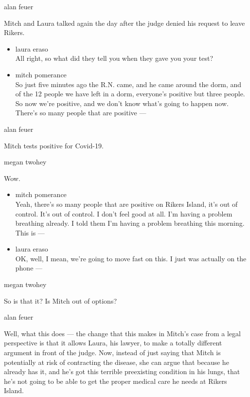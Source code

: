 alan feuer

Mitch and Laura talked again the day after the judge denied his request
to leave Rikers.

\begin{itemize}
\item
  laura eraso\\
  All right, so what did they tell you when they gave you your test?
\item
  mitch pomerance\\
  So just five minutes ago the R.N. came, and he came around the dorm,
  and of the 12 people we have left in a dorm, everyone's positive but
  three people. So now we're positive, and we don't know what's going to
  happen now. There's so many people that are positive ---
\end{itemize}

alan feuer

Mitch tests positive for Covid-19.

megan twohey

Wow.

\begin{itemize}
\item
  mitch pomerance\\
  Yeah, there's so many people that are positive on Rikers Island, it's
  out of control. It's out of control. I don't feel good at all. I'm
  having a problem breathing already. I told them I'm having a problem
  breathing this morning. This is ---
\item
  laura eraso\\
  OK, well, I mean, we're going to move fast on this. I just was
  actually on the phone ---
\end{itemize}

megan twohey

So is that it? Is Mitch out of options?

alan feuer

Well, what this does --- the change that this makes in Mitch's case from
a legal perspective is that it allows Laura, his lawyer, to make a
totally different argument in front of the judge. Now, instead of just
saying that Mitch is potentially at risk of contracting the disease, she
can argue that because he already has it, and he's got this terrible
preexisting condition in his lungs, that he's not going to be able to
get the proper medical care he needs at Rikers Island.

